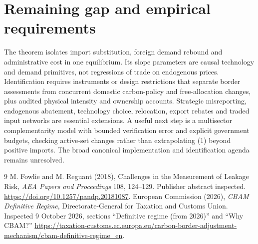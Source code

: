 \documentclass[11pt]{article}
\begin{document}
\section{Remaining gap and empirical requirements}
The theorem isolates import substitution, foreign demand rebound and
administrative cost in one equilibrium. Its slope parameters are causal
technology and demand primitives, not regressions of trade on endogenous
prices. Identification requires instruments or design restrictions that
separate border assessments from concurrent domestic carbon-policy and
free-allocation changes, plus audited physical intensity and ownership
accounts. Strategic misreporting, endogenous abatement, technology choice,
relocation, export rebates and traded input networks are essential
extensions. A useful next step is a multisector complementarity model
with bounded verification error and explicit government budgets, checking
active-set changes rather than extrapolating (1) beyond positive imports.
The broad canonical implementation and identification agenda remains
unresolved.

\begin{thebibliography}{9}
 M. Fowlie and M. Reguant (2018), Challenges in the Measurement
of Leakage Risk, \emph{AEA Papers and Proceedings} 108, 124--129.
Publisher abstract inspected. \url{https://doi.org/10.1257/pandp.20181087}.
 European Commission (2026), \emph{CBAM Definitive Regime},
Directorate-General for Taxation and Customs Union. Inspected 9 October
2026, sections ``Definitive regime (from 2026)'' and ``Why CBAM?''
\url{https://taxation-customs.ec.europa.eu/carbon-border-adjustment-mechanism/cbam-definitive-regime_en}.
\end{thebibliography}
\end{document}
